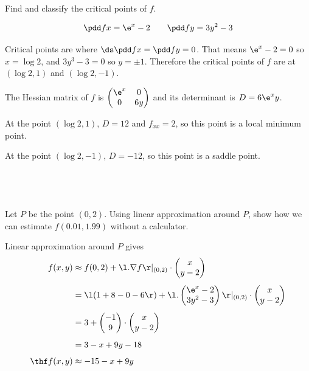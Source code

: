 \documentclass[a4paper]{article}
\begin{document}
\begin{questionbody}
Find and classify the critical points of $f$.
\end{questionbody}%
%
\[ \pdd fx = \e^x - 2 \qquad \pdd fy = 3y^2 - 3 \]

Critical points are where $\ds \pdd fx = \pdd fy = 0$. That means $\e^x - 2 = 0$ so $x = \log 2$, and $3y^3 - 3 = 0$ so $y = \pm 1$. Therefore the critical points of $f$ are at $(\log 2, 1)$ and $(\log 2, -1)$.

The Hessian matrix of $f$ is $\begin{pmatrix} \e^x & 0\\ 0 & 6y \end{pmatrix}$ and its determinant is $D = 6 \e^x y$.

At the point $(\log 2, 1)$, $D = 12$ and $f_{xx} = 2$, so this point is a local minimum point.

At the point $(\log 2, -1)$, $D = -12$, so this point is a saddle point.

\subsection{~} %

\begin{questionbody}
Let $P$ be the point $(0, 2)$. Using linear approximation around $P$, show how we can estimate $f(0.01, 1.99)$ without a calculator.
\end{questionbody}

Linear approximation around $P$ gives \begin{align*}
f(x, y) &\approx f(0, 2) + \l. \nabla f \r|_{(0,2)} \cdot \begin{pmatrix}x\\ y-2\end{pmatrix}\\[1ex]
&= \l( 1 + 8 - 0 - 6 \r) + \l. \begin{pmatrix}\e^x - 2\\ 3y^2 - 3\end{pmatrix} \r|_{(0,2)} \cdot \begin{pmatrix}x\\ y-2\end{pmatrix}\\[1ex]
&= 3 + \begin{pmatrix}-1\\ 9\end{pmatrix} \cdot \begin{pmatrix}x\\ y-2\end{pmatrix}\\[1ex]
&= 3 -x + 9y - 18\\[1ex]
\thf f(x, y) &\approx -15 -x + 9y
\end{align*}
\end{document}
